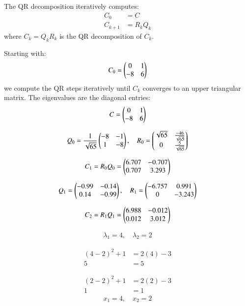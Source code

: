 \documentclass[journal]{IEEEtran}
\begin{document}
The QR decomposition iteratively computes:
\begin{align}
    C_0 &= C \\
    C_{k+1} &= R_k Q_k
\end{align}
where $C_k = Q_k R_k$ is the QR decomposition of $C_k$.

Starting with:
\begin{align}
    C_0 = \begin{pmatrix}0 & 1 \\ -8 & 6\end{pmatrix}
\end{align}
we compute the QR steps iteratively until $C_k$ converges to an upper triangular matrix. The eigenvalues are the diagonal entries:
\begin{align}
    C = \begin{pmatrix}0 & 1 \\ -8 & 6\end{pmatrix}
\end{align}

\begin{align}
    Q_0 = \frac{1}{\sqrt{65}} \begin{pmatrix}-8 & -1 \\ 1 & -8\end{pmatrix}, \quad
    R_0 = \begin{pmatrix}\sqrt{65} & \frac{-46}{\sqrt{65}} \\ 0 & \frac{5}{\sqrt{65}}\end{pmatrix}
\end{align}

\begin{align}
    C_1 = R_0 Q_0 = \begin{pmatrix}6.707 & -0.707 \\ 0.707 & 3.293\end{pmatrix}
\end{align}

\begin{align}
    Q_1 = \begin{pmatrix}-0.99 & -0.14 \\ 0.14 & -0.99\end{pmatrix}, \quad
    R_1 = \begin{pmatrix}-6.757 & 0.991 \\ 0 & -3.243\end{pmatrix}
\end{align}

\begin{align}
    C_2 = R_1 Q_1 = \begin{pmatrix}6.988 & -0.012 \\ 0.012 & 3.012\end{pmatrix}
\end{align}

\begin{align}
    \lambda_1 = 4, \quad \lambda_2 = 2
\end{align}

\begin{align}
    (4-2)^2 + 1 &= 2(4) - 3 \\
    5 &= 5
\end{align}

\begin{align}
    (2-2)^2 + 1 &= 2(2) - 3 \\
    1 &= 1
\end{align}
\begin{align}
    x_1 = 4, \quad x_2 = 2
\end{align}
\end{document}
